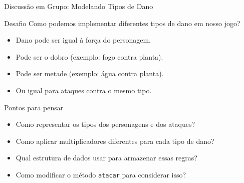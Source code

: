\begin{frame}{Discussão em Grupo: Modelando Tipos de Dano}

\begin{block}{Desafio}
Como podemos implementar diferentes tipos de dano em nosso jogo?  

\begin{itemize}
    \item Dano pode ser igual à força do personagem.
    \item Pode ser o dobro (exemplo: fogo contra planta).
    \item Pode ser metade (exemplo: água contra planta).
    \item Ou igual para ataques contra o mesmo tipo.
\end{itemize}


\begin{block}{Pontos para pensar}
\begin{itemize}
    \item Como representar os tipos dos personagens e dos ataques?
    \item Como aplicar multiplicadores diferentes para cada tipo de dano?
    \item Qual estrutura de dados usar para armazenar essas regras?
    \item Como modificar o método \texttt{atacar} para considerar isso?
\end{itemize}
\end{block}

\end{block}

\end{frame}


